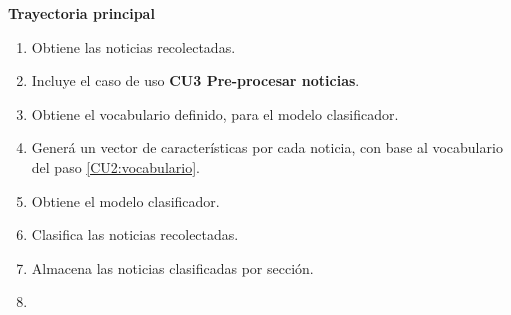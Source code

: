 

\begin{large}
	\textbf{Trayectoria principal}\\
\end{large}	

\begin{enumerate}[1.]

		
	\item \sistema Obtiene las noticias recolectadas.

	\item \sistema Incluye el caso de uso \textbf{CU3 Pre-procesar noticias}.

	\item \sistema \label{CU2:vocabulario}Obtiene el vocabulario definido, para el modelo clasificador.

	\item \sistema Generá un vector de características por cada noticia, con base al vocabulario del paso \ref{CU2:vocabulario}.

	\item \sistema Obtiene el modelo clasificador.

	\item \sistema Clasifica las noticias recolectadas.

	\item \sistema Almacena las noticias clasificadas por sección.
	
	\item \finCU	

\end{enumerate}
